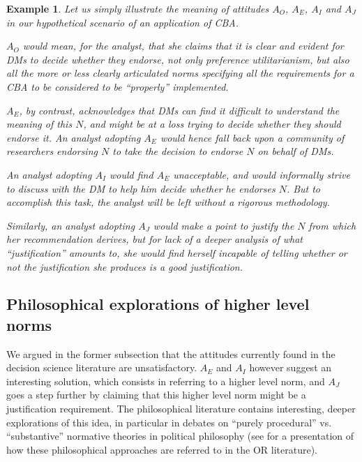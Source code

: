 \documentclass[preprint, french, english, 11pt, authoryear]{elsarticle}%
\newtheorem{example}{Example}
\begin{document}
\begin{example}
Let us simply illustrate the meaning of attitudes $A_O$, $A_E$, $A_I$ and $A_J$ in our hypothetical scenario of an application of \ac{CBA}.

$A_O$ would mean, for the analyst, that she claims that it is clear and evident for \acp{DM}
 to decide whether they endorse, not only preference utilitarianism, but also all the more or less clearly articulated norms specifying all the requirements for a \ac{CBA}
  to be considered to be ``properly'' implemented.

$A_E$, by contrast, acknowledges that \acp{DM}
 can find it difficult to understand the meaning of this $N$, and might be at a loss trying to decide whether they should endorse it. 
An analyst adopting $A_E$ would hence fall back upon a community of researchers endorsing $N$ to take the decision to endorse $N$ on behalf of \acp{DM}.

An analyst adopting $A_I$ would find $A_E$ unacceptable, and would informally strive to discuss with the \ac{DM}
 to help him decide whether he endorses $N$. But to accomplish this task, the analyst will be left without a rigorous methodology.

Similarly, an analyst adopting $A_J$ would make a point to justify the $N$ from which her recommendation derives, but for lack of a deeper analysis of what ``justification'' amounts to, she would find herself incapable of telling whether or not the justification she produces is a good justification.

\end{example}

\subsection{Philosophical explorations of higher level norms}
\label{sec:higher}
We argued in the former subsection that the attitudes currently found in the decision science literature are unsatisfactory. 
$A_E$ and $A_I$ however suggest an interesting solution, which consists in referring to a higher level norm, and $A_J$ goes a step further by claiming that this higher level norm might be a justification requirement.
The philosophical literature contains interesting, deeper explorations of this idea, in particular in debates on “purely procedural” vs. “substantive” normative theories in political philosophy (see \citep{white_challenge_2009} for a presentation of how these philosophical approaches are referred to in the \ac{OR} literature).
\end{document}
